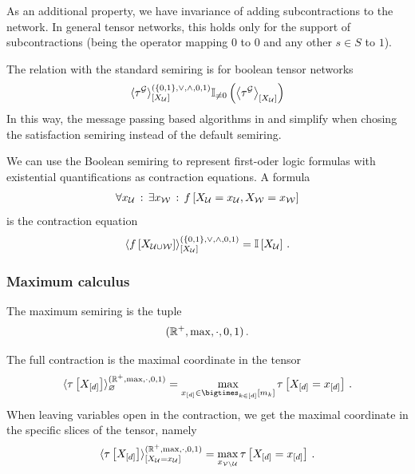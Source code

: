 As an additional property, we have invariance of adding subcontractions to the network.
In general tensor networks, this holds only for the support of subcontractions (being the operator mapping $0$ to $0$ and any other $s\in S$ to $1$).

The relation with the standard semiring is for boolean tensor networks
\begin{align*}
    \langle\tau^{\mathcal{G}}\rangle^{(\{0,1\},\lor,\land,0,1)}_{[X_{\mathcal{U}}]}
    \mathbb{I}_{\neq0}\left(\left\langle \tau^{\mathcal{G}}\right\rangle_{\left[ X_{\mathcal{U}} \right]}\right)
\end{align*}
In this way, the message passing based algorithms in  and  simplify when chosing the satisfaction semiring instead of the default semiring.


We can use the Boolean semiring to represent first-oder logic formulas with existential quantifications as contraction equations.
A formula
\begin{align*}
    \forall x_{\mathcal{U}} \,:\, \exists x_{\mathcal{W}} \,:\, f\left[X_{\mathcal{U}}=x_{\mathcal{U}},X_{\mathcal{W}}=x_{\mathcal{W}}\right]
\end{align*}
is the contraction equation
\begin{align*}
    \langle f\left[X_{\mathcal{U}\cup\mathcal{W}}\right]\rangle^{(\{0,1\},\lor,\land,0,1)}_{[X_{\mathcal{U}}]}
    = \mathbb{I}\left[X_{\mathcal{U}}\right] \, .
\end{align*}

\subsubsection{Maximum calculus}

The maximum semiring is the tuple
\begin{align*}
    (\mathbb{R}^+,\mathrm{max},\cdot,0,1)
    \, .
\end{align*}

The full contraction is the maximal coordinate in the tensor
\begin{align*}
    \srcontractionwrt{\hypercorewith}{\maxsemiring}
    = \max_{\shortcatindicesin} \hypercoreat{\indexedshortcatvariables} \, .
\end{align*}
When leaving variables open in the contraction, we get the maximal coordinate in the specific slices of the tensor, namely
\begin{align*}
    \langle\tau\left[X_{[d]}\right]\rangle^{(\mathbb{R}^+,\mathrm{max},\cdot,0,1)}_{[X_{\mathcal{U}}=x_{\mathcal{U}}]}
    = \max_{x_{\mathcal{V}\backslash\mathcal{U}}} \tau\left[X_{[d]}=x_{[d]}\right] \, .
\end{align*}

